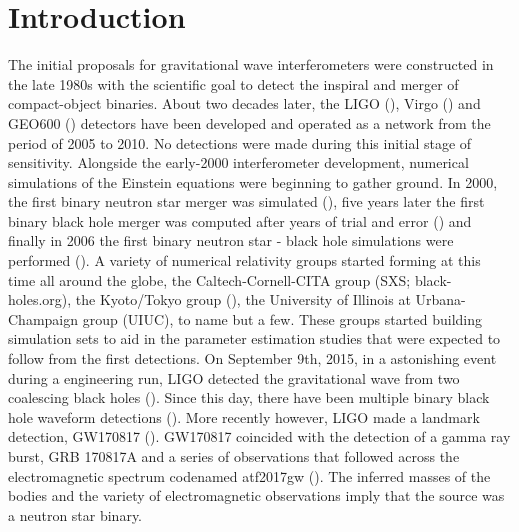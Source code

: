 
\chapter{Introduction}
\label{chap:intro}

The initial proposals for gravitational wave interferometers were
constructed in the late 1980s with the scientific goal to detect the inspiral and merger of compact-object binaries. About two decades later, the LIGO (\cite{ligo2018gwtc}), Virgo (\cite{acernese2015advanced}) and GEO600 (\cite{affeldt2014advanced}) detectors have been developed and operated as a network from the period of 2005 to 2010. No detections were made during this initial stage of sensitivity. Alongside the early-2000 interferometer development, numerical simulations of the Einstein equations were beginning to gather ground. In 2000, the first binary neutron star merger was simulated (\cite{shibata2000simulation}), five years later the first binary black hole merger was computed after years of trial and error (\cite{pretorius2005a}) and finally in 2006 the first binary neutron star - black hole simulations were performed (\cite{shibata2006merger}). A variety of numerical relativity groups started forming at this time all around the globe, the Caltech-Cornell-CITA group (SXS; black-holes.org), the Kyoto/Tokyo group (\cite{nagakura:2014hza}), the University of Illinois at Urbana-Champaign group (UIUC), to name but a few. These groups started building simulation sets to aid in the parameter estimation studies that were expected to follow from the first detections. On September 9th, 2015, in a astonishing event during a engineering run, LIGO detected the gravitational wave from two coalescing black holes (\cite{theligoscientific:2016wfe}). Since this day, there have been multiple binary black hole waveform detections (\cite{ligo2018gwtc}). More recently however, LIGO made a landmark detection, GW170817 (\cite{abbott2017gw170817}). GW170817
coincided with the detection of a gamma ray burst, GRB 170817A and a series of observations that followed across the electromagnetic spectrum codenamed atf2017gw (\cite{villar:2017wcc}). The inferred masses of the bodies and the variety of electromagnetic observations imply that the source was a neutron star binary.

